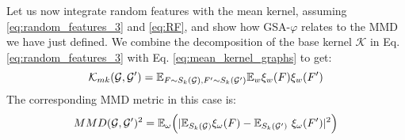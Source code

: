 Let us now integrate random features with the mean kernel, assuming \eqref{eq:random_features_3} and \eqref{eq:RF}, and show how GSA-$\varphi$ relates to the MMD we have just defined. We combine the decomposition of the base kernel $\mathcal{K}$ in Eq. \eqref{eq:random_features_3} with Eq. \eqref{eq:mean_kernel_graphs} to get:
\begin{equation}
    \label{eq:mk_rf}
    \mathcal{K}_{mk}(\mathcal{G},\mathcal{G}')= \mathbb{E}_{F \sim S_k(\mathcal{G}), F' \sim S_k(\mathcal{G}')} \mathbb{E}_w \xi_w(F)\xi_w(F')
\end{equation}
The corresponding MMD metric in this case is:
\begin{equation}
\label{eq:MMD-RF}
MMD(\mathcal{G},\mathcal{G}')^2 = \mathbb{E}_{\omega} \Big( | \mathbb{E}_{S_k(\mathcal{G})} \xi_\omega(F) - \mathbb{E}_{S_k(\mathcal{G}')} \
\xi_\omega(F') |^2 \Big)
\end{equation}

